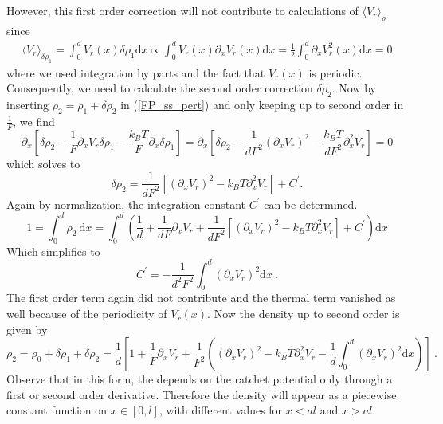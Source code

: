 \documentclass[aps,pre,onecolumn,showpacs,showkeys,a4paper]{revtex4}
\newcommand{\rmd}{{\mathrm d}}
\begin{document}
However, this first order correction will not contribute to calculations of $\langle V_r \rangle_\rho$ since
\begin{eqnarray}
\langle V_r \rangle_{\delta\rho_1} = \int_0^d V_r(x) \delta\rho_1 \rmd x\propto \int_0^d V_r(x)\partial_x V_r(x) \rmd x = \frac{1}{2}\int_0^d \partial_x V_r^2(x) \rmd x = 0
\end{eqnarray}
where we used integration by parts and the fact that $V_r(x)$ is periodic.
Consequently, we need to calculate the second order correction $\delta\rho_2$. 
Now by inserting $\rho_2 = \rho_1 + \delta\rho_2$ in (\ref{FP_ss_pert}) and only keeping up to second order in $\frac{1}{F}$, we find
 \begin{equation}
 \partial_x\left[\delta\rho_2-\frac{1}{F}\partial_x V_r\delta\rho_1 - \frac{k_B T}{F}\partial_x \delta\rho_1\right] =  \partial_x\left[\delta\rho_2-\frac{1}{dF^2}\left(\partial_x V_r\right)^2 - \frac{k_B T}{dF^2}\partial_x^2 V_r\right] = 0
 \end{equation}
which solves to
\begin{equation}
\delta\rho_2 = \frac{1}{dF^2}\left[\left(\partial_xV_r\right)^2 - k_B T \partial_x^2V_r\right] + C^\prime.
\end{equation}
Again by normalization, the integration constant $C^\prime$ can be determined.
\begin{equation}
1 = \int_0^d \rho_2\ \rmd x = \int_0^d \left(\frac{1}{d} + \frac{1}{dF}\partial_x V_r + \frac{1}{dF^2}\left[\left(\partial_xV_r\right)^2 - k_B T \partial_x^2V_r\right] + C^\prime\right) \rmd x 
\end{equation}
Which simplifies to
\begin{equation}
C^\prime = - \frac{1}{d^2F^2}\int_0^d\left(\partial_xV_r\right)^2 \rmd x\ . 
\end{equation}
The first order term again did not contribute and the thermal term vanished as well because of the periodicity of $V_r(x)$. 
Now the density up to second order is given by
\begin{equation}
\rho_2 = \rho_0 + \delta\rho_1 + \delta\rho_2 = \frac{1}{d}\left[1 + \frac{1}{F}\partial_x V_r + \frac{1}{F^2}\left(\left(\partial_xV_r\right)^2 - k_B T \partial_x^2V_r - \frac{1}{d}\int_0^d\left(\partial_xV_r\right)^2 \rmd x\right)\right] \ .
\end{equation}
Observe that in this form, the depends on the ratchet potential only through a first or second order derivative. 
Therefore the density will appear as a piecewise constant function on $x\in[0,l]$, with different values for $x<al$ and $x>al$. 
\end{document}
